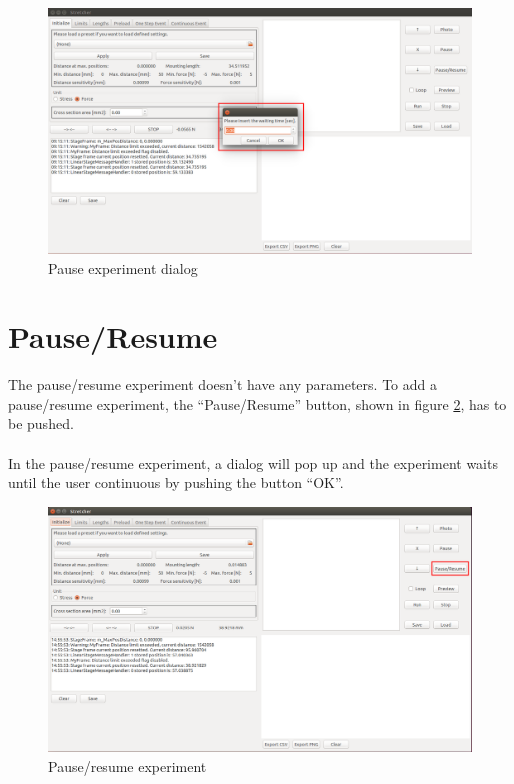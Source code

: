 \begin{figure}[!ht]
	\centering
		\includegraphics[width=1.0\textwidth]{images/Pause2}
	\caption{Pause experiment dialog}
	\label{fig:pause2}
\end{figure}

\section{Pause/Resume}
The pause/resume experiment doesn't have any parameters. To add a pause/resume experiment, the ``Pause/Resume'' button, shown in figure \ref{fig:pauseresume}, has to be pushed.
\\
\\
In the pause/resume experiment, a dialog will pop up and the experiment waits until the user continuous by pushing the button ``OK''.

\begin{figure}[!ht]
	\centering
		\includegraphics[width=1.0\textwidth]{images/PauseResume}
	\caption{Pause/resume experiment}
	\label{fig:pauseresume}
\end{figure}
